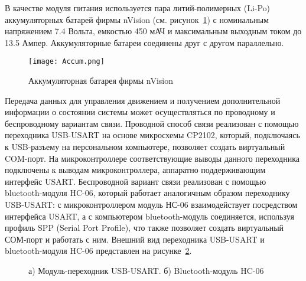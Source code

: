 В качестве модуля питания используется пара литий-полимерных (Li-Po) аккумуляторных батарей фирмы nVision (см. рисунок~\ref{Accum}) с номинальным напряжением 7.4 Вольта, емкостью 450 мАЧ и максимальным выходным током до 13.5 Ампер. Аккумуляторные батареи соединены друг с другом параллельно.

\begin{figure}[h]
	\centering
	\texttt{[image: Accum.png]}%
	\caption{Аккумуляторная батарея фирмы nVision}
	\label{Accum}
\end{figure}


Передача данных для управления движением и получением дополнительной информации о состоянии системы может осуществляться по проводному и беспроводному вариантам связи. Проводной способ связи реализован с помощью переходника USB-USART на основе микросхемы CP2102, который, подключаясь к USB-разъему на персональном компьютере, позволяет создать виртуальный COM-порт. На микроконтроллере соответствующие выводы данного переходника подключены к выводам микроконтроллера, аппаратно поддерживающим интерфейс USART. Беспроводной вариант связи реализован с помощью bluetooth-модуля HC-06, который работает аналогичным образом переходнику USB-USART: с микроконтроллером модуль НС-06 взаимодействует посредством интерфейса USART, а с компьютером bluetooth-модуль соединяется, используя профиль SPP (Serial Port Profile), что также позволяет создать виртуальный СОМ-порт и работать с ним. Внешний вид переходника USB-USART и bluetooth-модуля HC-06 представлен на рисунке~\ref{uartModules}.

\begin{figure}[!ht]
	\begin{minipage}[h]{0.5\linewidth}
	\end{minipage}
	\hfill
	\begin{minipage}[h]{0.5\linewidth}
	\end{minipage}

	\begin{minipage}[h]{0.5\linewidth}
	\end{minipage}
	\hfill
	\begin{minipage}[h]{0.5\linewidth}
	\end{minipage}

	\caption{а) Модуль-переходник USB-USART. б) Bluetooth-модуль HC-06}
	\label{uartModules}
\end{figure}



